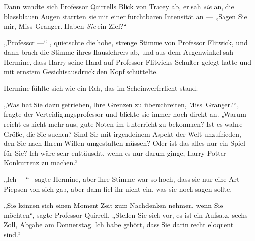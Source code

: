 Dann wandte sich Professor Quirrells Blick von Tracey ab, er sah \emph{sie} an, die blassblauen Augen starrten sie mit einer furchtbaren Intensität an —
„Sagen Sie mir, Miss~Granger. Haben \emph{Sie} ein Ziel?“

„Professor —“ , quietschte die hohe, strenge Stimme von Professor Flitwick, und dann brach die Stimme ihres Hauslehrers ab, und aus dem Augenwinkel sah Hermine, dass Harry seine Hand auf Professor Flitwicks Schulter gelegt hatte und mit ernstem Gesichtsausdruck den Kopf schüttelte.

Hermine fühlte sich wie ein Reh, das im Scheinwerferlicht stand.

„Was hat Sie dazu getrieben, Ihre Grenzen zu überschreiten, Miss~Granger?“, fragte der Verteidigungsprofessor und blickte sie immer noch direkt an.
„Warum reicht es nicht mehr aus, gute Noten im Unterricht zu bekommen? Ist es wahre Größe, die Sie suchen? Sind Sie mit irgendeinem Aspekt der Welt unzufrieden, den Sie nach Ihrem Willen umgestalten müssen? Oder ist das alles nur ein Spiel für Sie? Ich wäre sehr enttäuscht, wenn es nur darum ginge, Harry Potter Konkurrenz zu machen.“

„Ich —“ , sagte Hermine, aber ihre Stimme war so hoch, dass sie nur eine Art Piepsen von sich gab, aber dann fiel ihr nicht ein, was sie noch sagen sollte.

„Sie können sich einen Moment Zeit zum Nachdenken nehmen, wenn Sie möchten“, sagte Professor Quirrell.
„Stellen Sie sich vor, es ist ein Aufsatz, sechs Zoll, Abgabe am Donnerstag. Ich habe gehört, dass Sie darin recht eloquent sind.“

